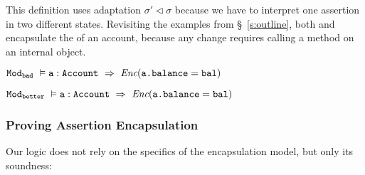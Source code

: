 \noindent
This definition   uses adaptation 
${\sigma' \triangleleft \sigma}$
because we have to interpret one assertion in two different states.
Revisiting the examples from \S~\ref{s:outline}, %
both \ModB and \ModC encapsulate the  of an
account, because any change  requires calling a method on an internal object.
%
\\
\strut \hspace{1cm}
$\ModB\ \vDash \prg{a}:\prg{Account}\ \Rightarrow\ \encaps{\prg{a.balance}=\prg{bal}}$
\\
\strut \hspace{1cm}
$\ModC\ \vDash \prg{a}:\prg{Account}\ \Rightarrow\ \encaps{\prg{a.balance}=\prg{bal}}$



\subsubsection{Proving Assertion Encapsulation}


Our logic does not rely on the specifics of the encapsulation
  model, but only its soundness:

